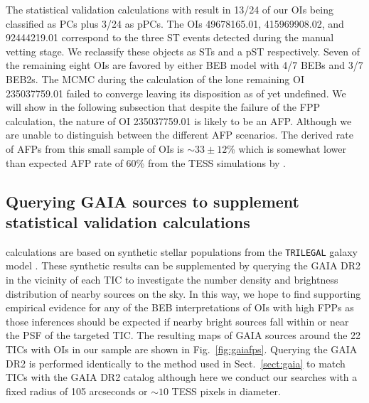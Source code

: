 The statistical validation calculations with \vespa{} result in 13/24 of our
OIs being classified as PCs plus 3/24 as pPCs.
The OIs 49678165.01, 415969908.02, and 92444219.01 correspond to the three
ST events detected during the manual vetting stage. We reclassify these objects as STs and a pST
respectively. Seven of the remaining eight OIs are favored by either BEB
model with 4/7 BEBs and 3/7 BEB2s. The
MCMC during the \vespa{} calculation of the lone remaining OI 235037759.01 failed to converge
leaving its disposition as of yet undefined. We will
show in the following subsection that despite the failure of the FPP calculation, the nature of OI
235037759.01 is likely to be an AFP. Although we are unable to distinguish between the different
AFP scenarios. The derived rate of AFPs from this small sample of OIs is $\sim 33\pm 12$\% which
is somewhat lower than expected AFP rate of 60\% from the TESS simulations by \citep{sullivan15}.


\subsection{Querying GAIA sources to supplement statistical validation calculations} \label{sect:gaiafps}
\vespa{} calculations are based on synthetic stellar populations from the
\texttt{TRILEGAL} galaxy model \citep{girardi05}. These synthetic results can be supplemented
by querying the GAIA DR2 in the vicinity of each TIC to investigate the number density and brightness
distribution of nearby sources on the sky. In this way, we hope to find supporting empirical evidence for
any of the BEB interpretations of OIs with high FPPs as those inferences should be expected if nearby bright
sources fall within or near the PSF of the targeted TIC. The resulting maps of GAIA sources around
the 22 TICs with OIs in our sample are shown in Fig.~\ref{fig:gaiafps}. Querying the GAIA DR2 is
performed identically to the method used in Sect.~\ref{sect:gaia} to match TICs with the GAIA DR2 catalog
although here we conduct our searches with a fixed radius of 105 arcseconds or $\sim 10$ TESS pixels
in diameter.

